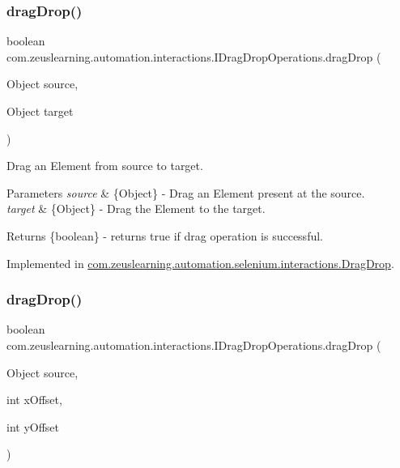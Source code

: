 \subsubsection{\texorpdfstring{drag\+Drop()}{dragDrop()}\hspace{0.1cm}{\footnotesize\ttfamily [1/2]}}
{\footnotesize\ttfamily boolean com.\+zeuslearning.\+automation.\+interactions.\+I\+Drag\+Drop\+Operations.\+drag\+Drop (\begin{DoxyParamCaption}\item[{Object}]{source,  }\item[{Object}]{target }\end{DoxyParamCaption})}

Drag an Element from {\ttfamily source} to {\ttfamily target}.


\begin{DoxyParams}{Parameters}
{\em source} & \{Object\} -\/ Drag an Element present at the {\ttfamily source}. \\
\hline
{\em target} & \{Object\} -\/ Drag the Element to the {\ttfamily target}.\\
\hline
\end{DoxyParams}
\begin{DoxyReturn}{Returns}
\{boolean\} -\/ returns {\ttfamily true} if drag operation is successful. 
\end{DoxyReturn}


Implemented in \hyperlink{classcom_1_1zeuslearning_1_1automation_1_1selenium_1_1interactions_1_1DragDrop_a8919942768f1ab1278ae453a669460df}{com.\+zeuslearning.\+automation.\+selenium.\+interactions.\+Drag\+Drop}.

\hypertarget{interfacecom_1_1zeuslearning_1_1automation_1_1interactions_1_1IDragDropOperations_aab663e7a80d41c763bbd89b2c98011eb}{}\label{interfacecom_1_1zeuslearning_1_1automation_1_1interactions_1_1IDragDropOperations_aab663e7a80d41c763bbd89b2c98011eb} 
\subsubsection{\texorpdfstring{drag\+Drop()}{dragDrop()}\hspace{0.1cm}{\footnotesize\ttfamily [2/2]}}
{\footnotesize\ttfamily boolean com.\+zeuslearning.\+automation.\+interactions.\+I\+Drag\+Drop\+Operations.\+drag\+Drop (\begin{DoxyParamCaption}\item[{Object}]{source,  }\item[{int}]{x\+Offset,  }\item[{int}]{y\+Offset }\end{DoxyParamCaption})}

